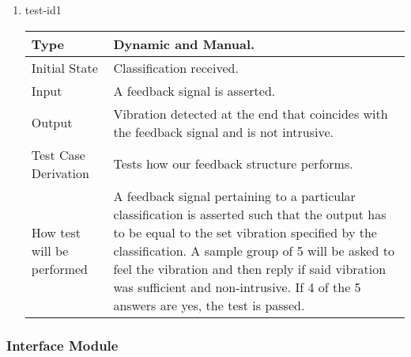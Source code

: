 \documentclass[12pt, titlepage]{article}
\begin{document}
\begin{enumerate}

\item{test-id1\\}

\begin{tabular}{ |p{5cm}||p{7cm}| }
    \hline
    Type & Dynamic and Manual. \\
    \hline
    Initial State  &  Classification received. \\
    \hline
    Input &   A feedback signal is asserted. \\
    \hline
    Output &   Vibration detected at the end that coincides with the feedback signal and is not intrusive.  \\
    \hline
    Test Case Derivation &   Tests how our feedback structure performs. \\
    \hline
    How test will be performed & A feedback signal pertaining to a particular classification is asserted such that the output has to be equal to the set vibration specified by the classification. A sample group of 5 will be asked to feel the vibration and then reply if said vibration was sufficient and non-intrusive. If 4 of the 5 answers are yes, the test is passed. \\
    \hline
\end{tabular}

\end{enumerate}



\subsubsection{Interface Module}
\end{document}
